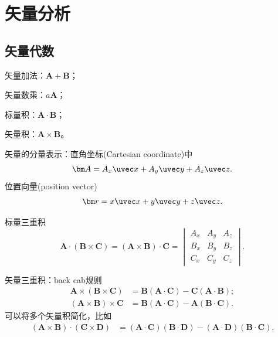 
\chapter{矢量分析}
\label{chap:vector analysis}

\section{矢量代数}
\label{sec:vector algebra}

\begin{compactitem}
    \item 矢量加法：$\bm A+\bm B$；
    \item 矢量数乘：$a\bm A$；
    \item 标量积：$\bm A\cdot\bm B$；
    \item 矢量积：$\bm A\times\bm B$。
	\item 矢量的分量表示：直角坐标(Cartesian coordinate)中
	\begin{equation}
        \bm A=A_x\uvec x+A_y\uvec y+A_z\uvec z.
    \end{equation}
    位置向量(position vector)
    \begin{equation}
        \bm r=x\uvec x+y\uvec y+z\uvec z.
    \end{equation}
	\item 标量三重积
    \begin{equation}
        \bm A\cdot(\bm B\times\bm C)=(\bm A\times\bm B)\cdot\bm C
        =\begin{vmatrix}
            A_x&A_y&A_z\\
            B_x&B_y&B_z\\
            C_x&C_y&C_z
        \end{vmatrix}.
    \end{equation}
    \item 矢量三重积：back cab规则
    \begin{subequations}
        \begin{align}
            \label{eqn:bac-cab}
            \bm A\times(\bm B\times\bm C)&=\bm B(\bm A\cdot\bm C)-\bm C(\bm A\cdot\bm B);\\
            (\bm A\times\bm B)\times\bm C&=\bm B(\bm A\cdot\bm C)-\bm A(\bm B\cdot\bm C).
        \end{align}
    \end{subequations}
    可以将多个矢量积简化，比如
    \begin{align*}
        (\bm A\times\bm B)\cdot(\bm C\times\bm D)&=(\bm A\cdot\bm C)(\bm B\cdot\bm D)-(\bm A\cdot\bm D)(\bm B\cdot\bm C).
    \end{align*}
\end{compactitem}

